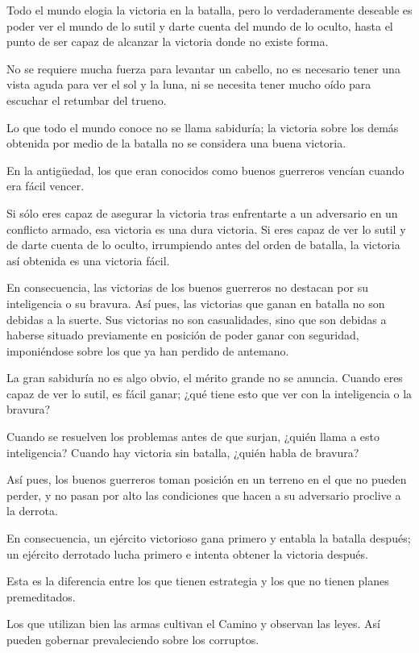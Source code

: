 Todo el mundo elogia la victoria en la batalla, pero lo verdaderamente deseable es poder ver el mundo de lo sutil y darte cuenta del mundo de lo oculto, hasta el punto de ser capaz de alcanzar la victoria donde no existe forma.

No se requiere mucha fuerza para levantar un cabello, no es necesario tener una vista aguda para ver el sol y la luna, ni se necesita tener mucho oído para escuchar el retumbar del trueno.

Lo que todo el mundo conoce no se llama sabiduría; la victoria sobre los demás obtenida por medio de la batalla no se considera una buena victoria.

En la antigüedad, los que eran conocidos como buenos guerreros vencían cuando era fácil vencer.

Si sólo eres capaz de asegurar la victoria tras enfrentarte a un adversario en un conflicto armado, esa victoria es una dura victoria. Si eres capaz de ver lo sutil y de darte cuenta de lo oculto, irrumpiendo antes del orden de batalla, la victoria así obtenida es una victoria fácil.

En consecuencia, las victorias de los buenos guerreros no destacan por su inteligencia o su bravura. Así pues, las victorias que ganan en batalla no son debidas a la suerte. Sus victorias no son casualidades, sino que son debidas a haberse situado previamente en posición de poder ganar con seguridad, imponiéndose sobre los que ya han perdido de antemano.

La gran sabiduría no es algo obvio, el mérito grande no se anuncia. Cuando eres capaz de ver lo sutil, es fácil ganar; ¿qué tiene esto que ver con la inteligencia o la bravura?

Cuando se resuelven los problemas antes de que surjan, ¿quién llama a esto inteligencia? Cuando hay victoria sin batalla, ¿quién habla de bravura?

Así pues, los buenos guerreros toman posición en un terreno en el que no pueden perder, y no pasan por alto las condiciones que hacen a su adversario proclive a la derrota.

En consecuencia, un ejército victorioso gana primero y entabla la batalla después; un ejército derrotado lucha primero e intenta obtener la victoria después.

Esta es la diferencia entre los que tienen estrategia y los que no tienen planes premeditados.

Los que utilizan bien las armas cultivan el Camino y observan las leyes. Así pueden gobernar prevaleciendo sobre los corruptos.

